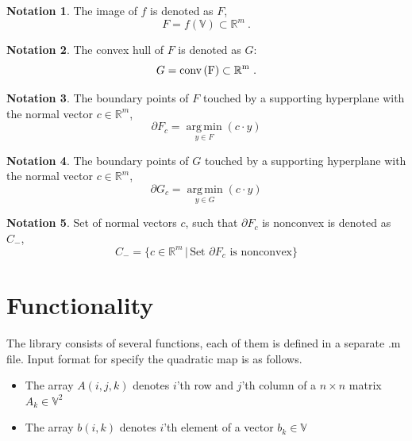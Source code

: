 \documentclass[a4paper]{article}
\DeclareMathOperator*{\argmin}{arg\,min}
\newcommand{\R}{\mathbb{R}}
\newcommand{\conv}{\rm{conv}\,}
\theoremstyle{definition}
\newtheorem{definition}{Notation}[]
\begin{document}
\begin{definition}
The image of $f$ is denoted as $F$,
	$$F=f(\mathbb{V})\subset \mathbb{R}^m\ .$$
\end{definition}
\begin{definition} The convex hull of $F$ is denoted as $G$:
	$$G=\conv (F)\subset \mathbb{R}^m\ .$$
\end{definition}
\begin{definition} The boundary points of $F$ touched by a supporting hyperplane with the normal vector $c\in\mathbb{R}^m$,
	$$\partial F_c=\argmin\limits_{y\in F}(c\cdot y)$$
\end{definition}
\begin{definition} The boundary points of $G$ touched by a supporting hyperplane with the normal vector $c\in\mathbb{R}^m$,
	$$\partial G_c=\argmin\limits_{y\in G}(c\cdot y)$$
\end{definition}
\begin{definition}\label{ex:c_minus}
	Set of normal vectors $c$, such that $\partial F_c$ is nonconvex is denoted as $C_-$,
	$$
	C_-=\{c\in\R^m\,\big|\,\mbox{Set }\partial F_c\mbox{ is nonconvex}\}
	$$
\end{definition}

\section*{Functionality}
The library consists of several functions, each of them is defined in a separate .m file.
Input format for specify the quadratic map is as follows.

\begin{itemize}
\item The array $A(i, j, k)$ denotes $i$'th row and $j$'th column of a $n\times n$ matrix $A_k\in\mathbb{V}^2$
\item The array $b(i, k)$ denotes $i$'th element of a vector $b_k\in\mathbb{V}$
\end{itemize}
\end{document}
